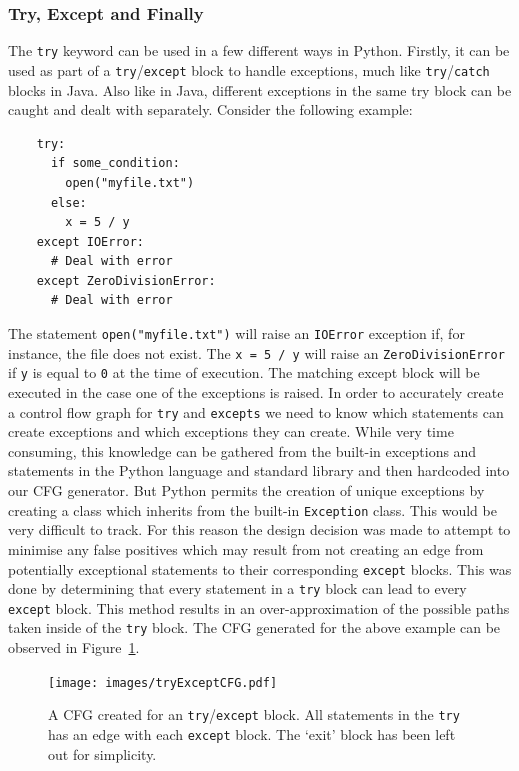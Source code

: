 \documentclass[12pt, titlepage]{article}
\begin{document}
\subsubsection{Try, Except and Finally}
The \texttt{try} keyword can be used in a few different ways in Python. Firstly, it can be used as part of a \texttt{try}/\texttt{except} block to handle exceptions, much like \texttt{try}/\texttt{catch} blocks in Java. Also like in Java, different exceptions in the same try block can be caught and dealt with separately. Consider the following example:
\begin{lstlisting}
    try:
      if some_condition:
        open("myfile.txt")
      else:
        x = 5 / y        
    except IOError:
      # Deal with error
    except ZeroDivisionError:
      # Deal with error
\end{lstlisting}
The statement \texttt{open("myfile.txt")} will raise an \texttt{IOError} exception if, for instance, the file does not exist. The \texttt{x = 5 / y} will raise an \texttt{ZeroDivisionError} if \texttt{y} is equal to \texttt{0} at the time of execution. The matching except block will be executed in the case one of the exceptions is raised. In order to accurately create a control flow graph for \texttt{try} and \texttt{excepts} we need to know which statements can create exceptions and which exceptions they can create. While very time consuming, this knowledge can be gathered from the built-in exceptions and statements in the Python language and standard library and then hardcoded into our CFG generator. But Python permits the creation of unique exceptions by creating a class which inherits from the built-in \texttt{Exception} class. This would be very difficult to track. For this reason the design decision was made to attempt to minimise any false positives which may result from not creating an edge from potentially exceptional statements to their corresponding \texttt{except} blocks. This was done by determining that every statement in a \texttt{try} block can lead to every \texttt{except} block. This method results in an over-approximation of the possible paths taken inside of the \texttt{try} block. The CFG generated for the above example can be observed in Figure~\ref{fig:tryExceptCFG}. \\

\begin{figure}
    \centering
    \texttt{[image: images/tryExceptCFG.pdf]}
    \caption{A CFG created for an \texttt{try}/\texttt{except} block. All statements in the \texttt{try} has an edge with each \texttt{except} block. The `exit' block has been left out for simplicity.}
    \label{fig:tryExceptCFG}
\end{figure}
\end{document}
